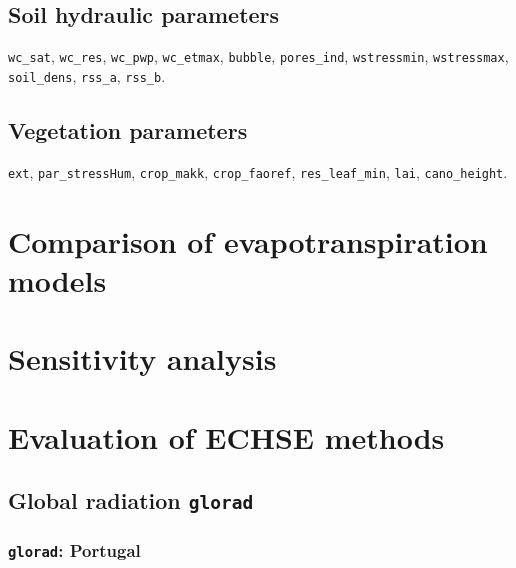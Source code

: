 \documentclass{scrreprt}
\begin{document}
\section{Soil hydraulic parameters} \label{sec:parest_soil}

\verb!wc_sat!, \verb!wc_res!, \verb!wc_pwp!, \verb!wc_etmax!, \verb!bubble!, \verb!pores_ind!, \verb!wstressmin!, \verb!wstressmax!, \verb!soil_dens!, \verb!rss_a!, \verb!rss_b!.

\section{Vegetation parameters} \label{sec:parest_veg}

\verb!ext!, \verb!par_stressHum!, \verb!crop_makk!, \verb!crop_faoref!, \verb!res_leaf_min!, \verb!lai!, \verb!cano_height!.


\chapter{Comparison of evapotranspiration models} \label{ch:modelcomp}


\chapter{Sensitivity analysis} \label{ch:sensana}


\chapter{Evaluation of ECHSE methods} \label{ch:methodcomp}

\section{Global radiation \texttt{glorad}}

\subsection{\texttt{glorad}: Portugal}
\end{document}
